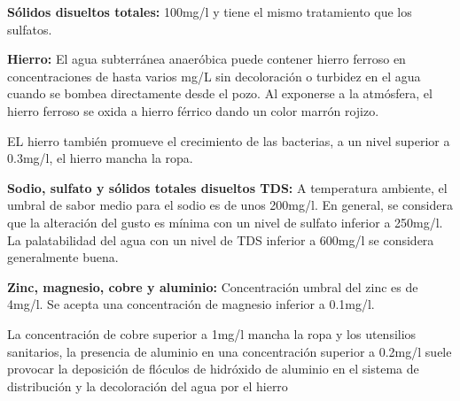 \textbf{Sólidos disueltos totales:} 100mg/l y tiene el mismo tratamiento que los sulfatos.

\textbf{Hierro:} El agua subterránea anaeróbica puede contener hierro ferroso en concentraciones de hasta varios mg/L sin decoloración o turbidez en el agua cuando se bombea directamente desde el pozo. Al exponerse a la atmósfera, el hierro ferroso se oxida a hierro férrico dando un color marrón rojizo.

EL hierro también promueve el crecimiento de las bacterias, a un nivel superior a 0.3mg/l, el hierro mancha la ropa.

\textbf{Sodio, sulfato y sólidos totales disueltos TDS:} A temperatura ambiente, el umbral de sabor medio para el sodio es de unos 200mg/l. En general, se considera que la alteración del gusto es mínima con un nivel de sulfato inferior a 250mg/l. La palatabilidad del agua con un nivel de TDS inferior a 600mg/l se considera generalmente buena.

\textbf{Zinc, magnesio, cobre y aluminio:} Concentración umbral del zinc es de 4mg/l. Se acepta una concentración de magnesio inferior a 0.1mg/l.

La concentración de cobre superior a 1mg/l mancha la ropa y los utensilios sanitarios, la presencia de aluminio en una concentración superior a 0.2mg/l suele provocar la deposición de flóculos de hidróxido de aluminio en el sistema de distribución y la decoloración del agua por el hierro

